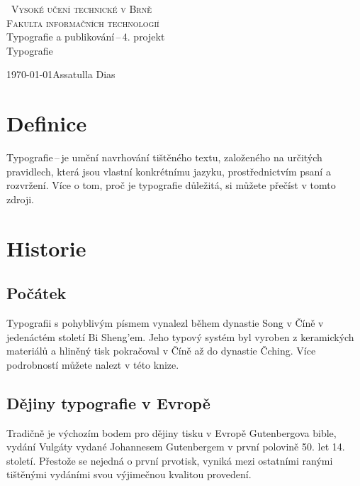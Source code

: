 \documentclass[a4paper, 11pt]{article}
\begin{document}
\begin{titlepage}
        \begin{center}
            \textsc{\Huge ~Vysoké učení technické v Brně \\[0.3em]
            \huge{Fakulta informačních technologií}}\\
            {\LARGE Typografie a publikování\,--\,4. projekt\\[0.3em]
            \Huge{Typografie}}
        \end{center}
        {\Large\today \hfill Assatulla Dias }
    \end{titlepage}
    \newpage
    
    \section{Definice}
    Typografie\,--\,je umění navrhování tištěného textu, založeného na určitých pravidlech, která jsou vlastní konkrétnímu jazyku, prostřednictvím psaní a rozvržení.
    Více o tom, proč je typografie důležitá, si můžete přečíst v tomto zdroji.\cite{Danielle2013}
    
    \section{Historie}
    
    \subsection{Počátek}
    Typografii s pohyblivým písmem vynalezl během dynastie Song v Číně v jedenáctém století Bi Sheng'em. Jeho typový systém byl vyroben z keramických materiálů a hliněný tisk pokračoval v Číně až do dynastie Čching. Více podrobností můžete nalezt v této knize.\cite{Nedham1994}
    
    \subsection{Dějiny typografie v Evropě}
    Tradičně je výchozím bodem pro dějiny tisku v Evropě Gutenbergova bible, vydání Vulgáty vydané Johannesem Gutenbergem v první polovině 50. let 14. století. Přestože se nejedná o první prvotisk, vyniká mezi ostatními ranými tištěnými vydáními svou výjimečnou kvalitou provedení.\cite{Davies1996}
    
\end{document}
